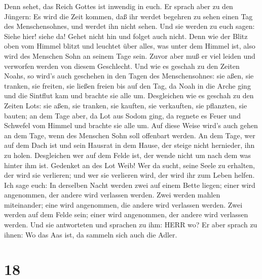 Denn sehet, das Reich Gottes ist inwendig in euch.  Er
sprach aber zu den Jüngern: Es wird die Zeit kommen, daß ihr werdet
begehren zu sehen einen Tag des Menschensohnes, und werdet ihn nicht
sehen.  Und sie werden zu euch sagen: Siehe hier! siehe da!
Gehet nicht hin und folget auch nicht.  Denn wie der Blitz
oben vom Himmel blitzt und leuchtet über alles, was unter dem Himmel
ist, also wird des Menschen Sohn an seinem Tage sein. 
Zuvor aber muß er viel leiden und verworfen werden von diesem
Geschlecht.  Und wie es geschah zu den Zeiten Noahs, so
wird's auch geschehen in den Tagen des Menschensohnes:  sie
aßen, sie tranken, sie freiten, sie ließen freien bis auf den Tag, da
Noah in die Arche ging und die Sintflut kam und brachte sie alle um.
 Desgleichen wie es geschah zu den Zeiten Lots: sie aßen,
sie tranken, sie kauften, sie verkauften, sie pflanzten, sie bauten;
 an dem Tage aber, da Lot aus Sodom ging, da regnete es
Feuer und Schwefel vom Himmel und brachte sie alle um.  Auf
diese Weise wird's auch gehen an dem Tage, wenn des Menschen Sohn soll
offenbart werden.  An dem Tage, wer auf dem Dach ist und
sein Hausrat in dem Hause, der steige nicht hernieder, ihn zu holen.
Desgleichen wer auf dem Felde ist, der wende nicht um nach dem was
hinter ihm ist.  Gedenket an des Lot Weib! 
Wer da sucht, seine Seele zu erhalten, der wird sie verlieren; und wer
sie verlieren wird, der wird ihr zum Leben helfen.  Ich
sage euch: In derselben Nacht werden zwei auf einem Bette liegen; einer
wird angenommen, der andere wird verlassen werden.  Zwei
werden mahlen miteinander; eine wird angenommen, die andere wird
verlassen werden.  Zwei werden auf dem Felde sein; einer
wird angenommen, der andere wird verlassen werden.  Und sie
antworteten und sprachen zu ihm: HERR wo? Er aber sprach zu ihnen: Wo
das Aas ist, da sammeln sich auch die Adler.

\hypertarget{section-17}{%
\section{18}\label{section-17}}

